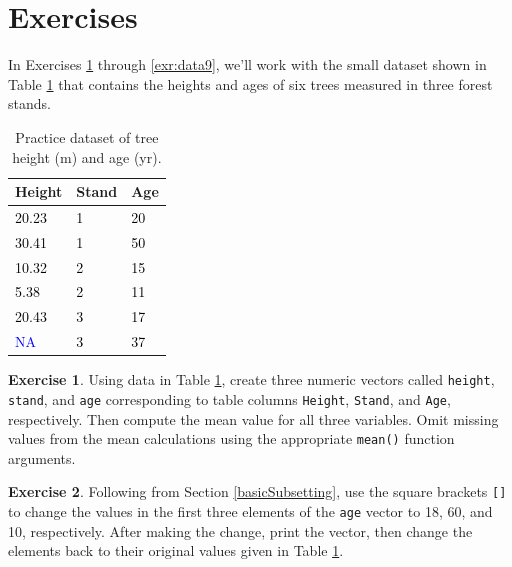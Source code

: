 \documentclass[
  11pt,
]{krantz}
\theoremstyle{definition}
\theoremstyle{definition}
\theoremstyle{definition}
\newtheorem{exercise}{Exercise}[chapter]
\theoremstyle{definition}
\theoremstyle{remark}
\begin{document}
\hypertarget{exercisesData}{%
\section{Exercises}\label{exercisesData}}

In Exercises \ref{exr:data1} through \ref{exr:data9}, we'll work with the small dataset shown in Table \ref{tab:dataExTable} that contains the heights and ages of six trees measured in three forest stands.

\begin{table}[!h]

\caption{\label{tab:dataExTable}Practice dataset of tree height (m) and age (yr).}
\centering
\begin{tabular}[t]{>{\centering\arraybackslash}p{8em}>{\centering\arraybackslash}p{8em}>{\centering\arraybackslash}p{8em}}
\toprule
Height & Stand & Age\\
\midrule
\textcolor{black}{20.23} & \textcolor{black}{1} & \textcolor{black}{20}\\
\textcolor{black}{30.41} & \textcolor{black}{1} & \textcolor{black}{50}\\
\textcolor{black}{10.32} & \textcolor{black}{2} & \textcolor{black}{15}\\
\textcolor{black}{5.38} & \textcolor{black}{2} & \textcolor{black}{11}\\
\textcolor{black}{20.43} & \textcolor{black}{3} & \textcolor{black}{17}\\
\addlinespace
\textcolor{blue}{NA} & \textcolor{black}{3} & \textcolor{black}{37}\\
\bottomrule
\end{tabular}
\end{table}

\begin{exercise}
\protect\hypertarget{exr:data1}{}\label{exr:data1}Using data in Table \ref{tab:dataExTable}, create three numeric vectors called \texttt{height}, \texttt{stand}, and \texttt{age} corresponding to table columns \texttt{Height}, \texttt{Stand}, and \texttt{Age}, respectively. Then compute the mean value for all three variables. Omit missing values from the mean calculations using the appropriate \texttt{mean()} function arguments.
\end{exercise}

\begin{exercise}
\protect\hypertarget{exr:data2}{}\label{exr:data2}Following from Section \ref{basicSubsetting}, use the square brackets \texttt{{[}{]}} to change the values in the first three elements of the \texttt{age} vector to 18, 60, and 10, respectively. After making the change, print the vector, then change the elements back to their original values given in Table \ref{tab:dataExTable}.
\end{exercise}
\end{document}
